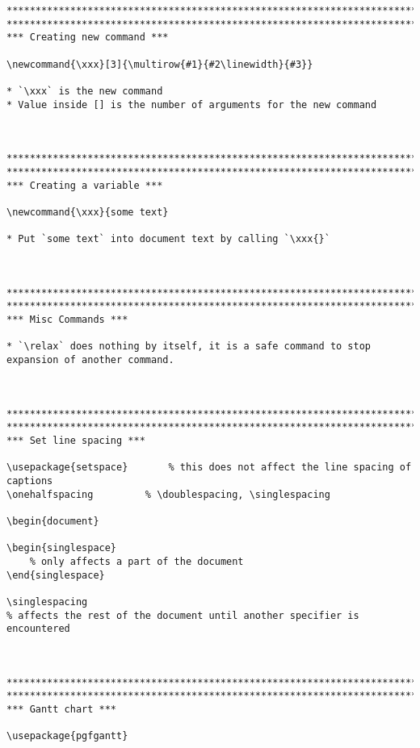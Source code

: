 \documentclass{article}
\begin{document}
\begin{lstlisting}[language={[LaTeX]TeX}, caption={Alternative short names.}]
*********************************************************************************************
*********************************************************************************************
*** Creating new command ***

\newcommand{\xxx}[3]{\multirow{#1}{#2\linewidth}{#3}}

* `\xxx` is the new command
* Value inside [] is the number of arguments for the new command



*********************************************************************************************
*********************************************************************************************
*** Creating a variable ***

\newcommand{\xxx}{some text}

* Put `some text` into document text by calling `\xxx{}`



*********************************************************************************************
*********************************************************************************************
*** Misc Commands ***

* `\relax` does nothing by itself, it is a safe command to stop expansion of another command.



*********************************************************************************************
*********************************************************************************************
*** Set line spacing ***

\usepackage{setspace}		% this does not affect the line spacing of captions
\onehalfspacing			% \doublespacing, \singlespacing

\begin{document}

\begin{singlespace}
    % only affects a part of the document
\end{singlespace}

\singlespacing
% affects the rest of the document until another specifier is encountered



*********************************************************************************************
*********************************************************************************************
*** Gantt chart ***

\usepackage{pgfgantt}





\end{lstlisting}
\end{document}
